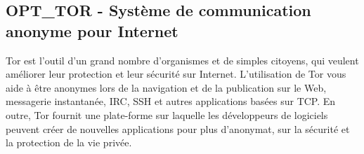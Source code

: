 \subsection{OPT\_TOR - Système de communication anonyme pour Internet}

Tor est l'outil d'un grand nombre d'organismes et de simples citoyens, qui
veulent améliorer leur protection et leur sécurité sur Internet. L'utilisation
de Tor vous aide à être anonymes lors de la navigation et de la publication sur
le Web, messagerie instantanée, IRC, SSH et autres applications basées sur TCP.
En outre, Tor fournit une plate-forme sur laquelle les développeurs de logiciels
peuvent créer de nouvelles applications pour plus d'anonymat, sur la sécurité et
la protection de la vie privée.


